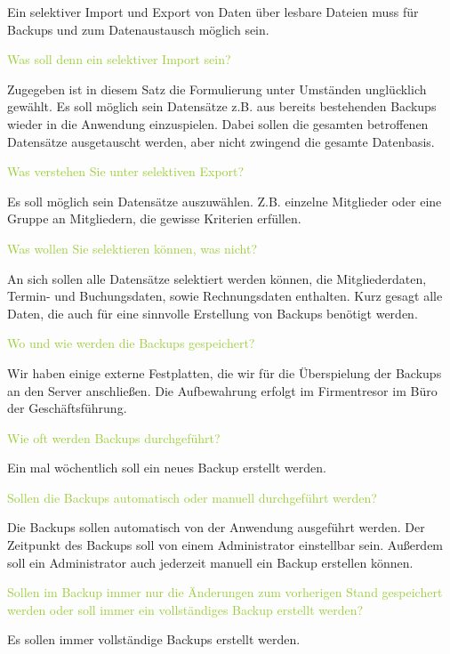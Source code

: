 Ein selektiver Import und Export von Daten über lesbare Dateien muss für Backups und zum Datenaustausch möglich sein. 

\textcolor{YellowGreen}{Was soll denn ein selektiver Import sein?}

\textcolor{NavyBlue}{Zugegeben ist in diesem Satz die Formulierung unter Umständen unglücklich gewählt. Es soll möglich sein Datensätze z.B. aus bereits bestehenden Backups wieder in die Anwendung einzuspielen. Dabei sollen die gesamten betroffenen Datensätze ausgetauscht werden, aber nicht zwingend die gesamte Datenbasis.}

\textcolor{YellowGreen}{Was verstehen Sie unter selektiven Export?}

\textcolor{NavyBlue}{Es soll möglich sein Datensätze auszuwählen. Z.B. einzelne Mitglieder oder eine Gruppe an Mitgliedern, die gewisse Kriterien erfüllen.}

\textcolor{YellowGreen}{Was wollen Sie selektieren können, was nicht?}

\textcolor{NavyBlue}{An sich sollen alle Datensätze selektiert werden können, die Mitgliederdaten, Termin- und Buchungsdaten, sowie Rechnungsdaten enthalten. Kurz gesagt alle Daten, die auch für eine sinnvolle Erstellung von Backups benötigt werden. }

\textcolor{YellowGreen}{Wo und wie werden die Backups gespeichert?}

\textcolor{NavyBlue}{Wir haben einige externe Festplatten, die wir für die Überspielung der Backups an den Server anschließen. Die Aufbewahrung erfolgt im Firmentresor im Büro der Geschäftsführung. }

\textcolor{YellowGreen}{Wie oft werden Backups durchgeführt?}

\textcolor{NavyBlue}{Ein mal wöchentlich soll ein neues Backup erstellt werden.}

\textcolor{YellowGreen}{Sollen die Backups automatisch oder manuell durchgeführt werden?}

\textcolor{NavyBlue}{Die Backups sollen automatisch von der Anwendung ausgeführt werden. Der Zeitpunkt des Backups soll von einem Administrator einstellbar sein. Außerdem soll ein Administrator auch jederzeit manuell ein Backup erstellen können.}

\textcolor{YellowGreen}{Sollen im Backup immer nur die Änderungen zum vorherigen Stand gespeichert werden oder soll immer ein vollständiges Backup erstellt werden?}

\textcolor{NavyBlue}{Es sollen immer vollständige Backups erstellt werden.}

